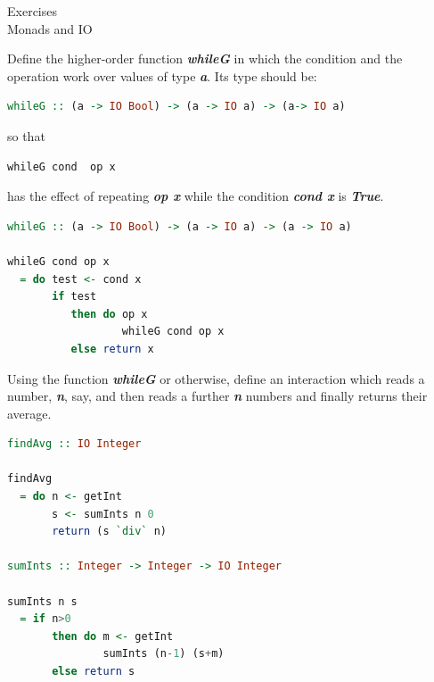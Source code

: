 \documentclass{article}
\newcommand\ExTitle{Monads and IO}
\newcommand\fullExTitle{Exercises \\ \ExTitle }
\begin{document}
\begin{Huge}
	\begin{center}
	\fullExTitle
	\end{center}
\end{Huge}


\begin{exercise}
Define the higher-order function \textit{\textbf{whileG}} in which the condition and the operation work over values of type \textit{\textbf{a}}. Its type should be:
\begin{lstlisting}[language=Haskell]
whileG :: (a -> IO Bool) -> (a -> IO a) -> (a-> IO a) 
\end{lstlisting}
so that 
 \begin{lstlisting}[language=Haskell]
whileG cond  op x
  \end{lstlisting}
has the effect of repeating \textit{\textbf{op x}}  while the condition \textit{\textbf{cond x }} is \textit{\textbf{True}}.

\end{exercise} 


\begin{solution}
\begin{lstlisting}[language=Haskell]
whileG :: (a -> IO Bool) -> (a -> IO a) -> (a -> IO a)

whileG cond op x
  = do test <- cond x
       if test
          then do op x
                  whileG cond op x
          else return x
 \end{lstlisting}
 \end{solution}

\begin{exercise} 
Using the function \textit{\textbf{whileG}} or otherwise, define an interaction which reads a number, \textit{\textbf{n}}, say, and then reads a further \textit{\textbf{n}} numbers and finally returns their average.  
\end{exercise} 

\begin{solution}
\begin{lstlisting}[language=Haskell]
findAvg :: IO Integer

findAvg 
  = do n <- getInt
       s <- sumInts n 0
       return (s `div` n)

sumInts :: Integer -> Integer -> IO Integer

sumInts n s 
  = if n>0 
       then do m <- getInt
               sumInts (n-1) (s+m)
       else return s     
\end{lstlisting}
\end{solution}
\end{document}
